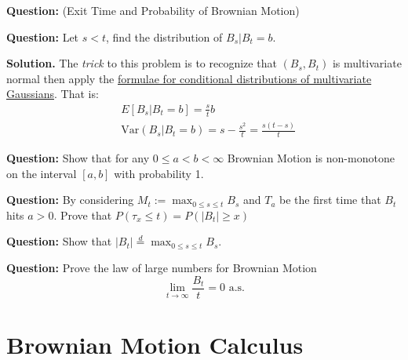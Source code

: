 \documentclass{article}
\begin{document}
\begin{tcolorbox}[colframe=black,colback=gray!5,boxrule=0.5pt]
\textbf{Question:} (Exit Time and Probability of Brownian Motion) 
\end{tcolorbox}

\begin{tcolorbox}[colframe=black,colback=gray!5,boxrule=0.5pt]
\textbf{Question:} Let $s < t$, find the distribution of $B_s | B_t = b$.
\end{tcolorbox}
\textbf{Solution.} The \textit{trick} to this problem is to recognize that $(B_s, B_t)$ is multivariate normal then apply the \href{https://online.stat.psu.edu/stat505/lesson/6/6.1}{formulae for conditional distributions of multivariate Gaussians}. That is: 
\begin{align*}
    & E[B_s | B_t=b] = \frac{s}{t}b \\
    &\text{Var}(B_s | B_t=b) = s-\frac{s^2}{t} = \frac{s(t-s)}{t}
\end{align*}

\begin{tcolorbox}[colframe=black,colback=gray!5,boxrule=0.5pt]
\textbf{Question:} Show that for any $0\leq a < b<\infty$ Brownian Motion is non-monotone on the interval $[a,b]$ with probability 1.  
\end{tcolorbox}


\begin{tcolorbox}[colframe=black,colback=gray!5,boxrule=0.5pt]
\textbf{Question:} By considering $M_t := \max_{0\leq s \leq t} B_s$ and $T_a$ be the first time that $B_t$ hits $a > 0$. Prove that $P(\tau_x\leq t) = P(|B_t|\geq x)$  
\end{tcolorbox}

\begin{tcolorbox}[colframe=black,colback=gray!5,boxrule=0.5pt]
\textbf{Question:} Show that $|B_t| \stackrel{d}{=} \max_{0\leq s\leq t} B_s$.
\end{tcolorbox}

\begin{tcolorbox}[colframe=black,colback=gray!5,boxrule=0.5pt]
\textbf{Question:} Prove the law of large numbers for Brownian Motion
$$\lim_{t\to\infty}\frac{B_t}{t} = 0 \text{ a.s.}$$
\end{tcolorbox}


\newpage
\section{Brownian Motion Calculus}


\newpage
 
\end{document}
